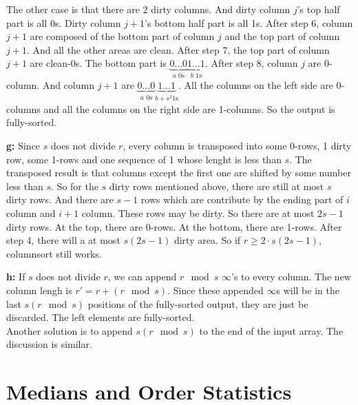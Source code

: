 \documentclass{book}
\begin{document}
\begin{CJK}{UTF8}{gkai}
The other case is that there are $2$ dirty columns.  And dirty column $j$'s top 
half part is all 0s. Dirty column $j+1$'s bottom half part is all 1s. After step 
6, column $j+1$ are composed of the bottom part of column $j$ and the top part 
of column $j+1$. And all the other areas are clean. After step 7, the top part 
of column $j+1$ are clean-0s. The bottom part is $\underbrace{0\dots0}_\text{$a$ 
0s}\underbrace{1\dots1}_\text{$b$ 1s}$. After step 8, column $j$ are 0-column.  
And column $j+1$ are $\underbrace{0\dots0}_\text{$a$ 
0s}\underbrace{1\dots1}_\text{$b+s^2$
1s}$. All the columns on the left side are 0-columns and all the columns on the 
right side are 1-columns. So the output is fully-sorted.

\textbf{g:} Since $s$ does not divide $r$, every column is transposed into some 
0-rows, 1 dirty row, some 1-rows and one sequence of 1 whose lenght is less than 
$s$. The transposed result is that columns except the first one are shifted by 
some number less than $s$. So for the $s$ dirty rows mentioned above, there are 
still at most $s$ dirty rows. And there are $s-1$ rows which are contribute by 
the ending part of $i$ column and $i+1$ column. These rows may be dirty. So 
there are at most $2s-1$ dirty rows. At the top, there are 0-rows. At the 
bottom, there are 1-rows. After step 4, there will a at most $s(2s-1)$ dirty 
area. So if $r \ge 2\cdot s(2s-1)$, columnsort still works.

\textbf{h:} If $s$ does not divide $r$, we can append $r \mod s$ $\infty$'s to 
every column. The new column lengh is $r'=r+(r\mod s)$. Since these appended 
$\infty$s will be in the last $s (r \mod s)$ positions of the fully-sorted 
output, they are just be discarded.  The left elements are fully-sorted. \\
Another solution is to append $s(r \mod s)$ to the end of the input array. The 
discussion is similar.


\chapter{Medians and Order Statistics}


\end{CJK}
\end{document}
